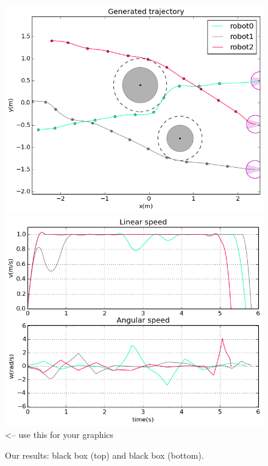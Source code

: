 \documentclass[eprint]{actapoly}
\begin{document}
\begin{figure}\centering
  \includegraphics[width=\linewidth]{./images/no_collision/multirobot-path.png} 
  \\[1mm]
  \includegraphics[width=\linewidth]{./images/no_collision/multirobot-vw.png} %
<-- use this for your graphics
  \caption{Our results: black box (top) and black box 
(bottom).\label{fig:nocollision}}
\label{fig:res}
\end{figure}
\end{document}

